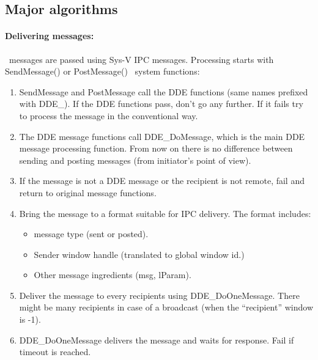 \subsection{Major algorithms}

\paragraph{Delivering messages:}
\label{sec:DeliveringMessages}
\windoz\ messages are passed using Sys-V IPC messages. Processing
starts with SendMessage() or PostMessage() \windoz\ system
functions:
\begin{enumerate}
  \item SendMessage and PostMessage call the DDE functions (same names
    prefixed with DDE\_). If the DDE functions pass, don't go any
    further. If it fails try to process the message in the
    conventional way. 
  \item The DDE message functions call DDE\_DoMessage, which is
    the main DDE message processing function. From now on there is no
    difference between sending and posting messages (from initiator's
    point of view).
  \item If the message is not a DDE message or the recipient is not
    remote, fail and return to original message functions.
  \item Bring the message to a format suitable for IPC delivery. The
    format includes:
    \begin{itemize}
      \item message type (sent or posted).
      \item Sender window handle (translated to global window id.)
      \item Other message ingredients (msg, lParam).
    \end{itemize}
  \item Deliver the message to every recipients using
    DDE\_DoOneMessage. There might be many recipients in case of a
    broadcast (when the ``recipient'' window is -1). 
  \item DDE\_DoOneMessage delivers the message and waits for response.
    Fail if timeout is reached.
\end{enumerate}


